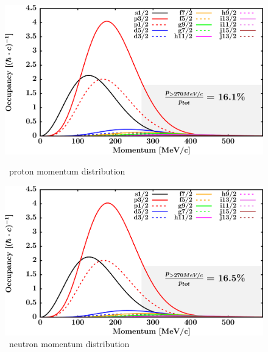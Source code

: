 \begin{figure}[hbtp]
    \centering
    \begin{minipage}{0.45\textwidth}
        \centering
        \includegraphics[width=\textwidth]{figures/o16_protonLJMomentumDistIntegral.png}
        \caption*{\oSix\ proton momentum distribution}
        \label{DOMFitData_o16_proton_momentumDist}
    \end{minipage}\hspace{6pt}
    \begin{minipage}{0.45\textwidth}
        \centering
        \includegraphics[width=\textwidth]{figures/o16_neutronLJMomentumDistIntegral.png}
        \caption*{\oSix\ neutron momentum distribution}
        \label{DOMFitData_o16_neutron_momentumDist}
    \end{minipage}
\end{figure}
\vspace{0.3in}
